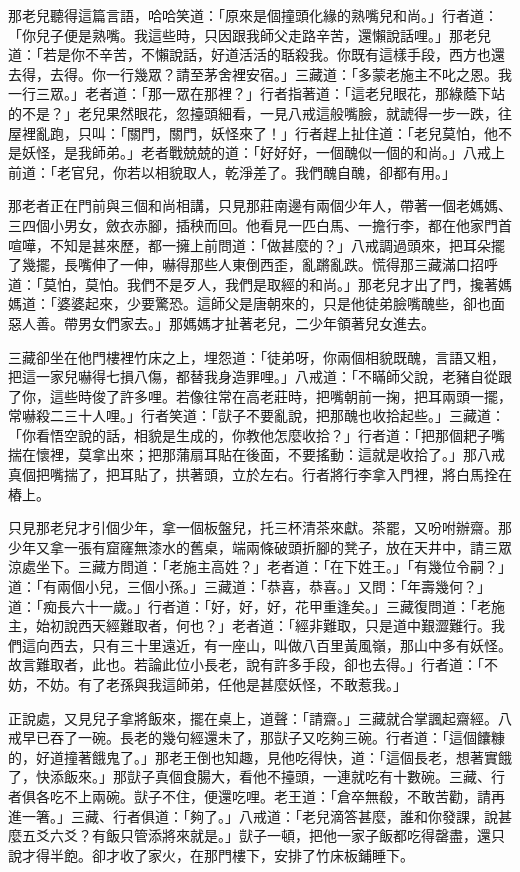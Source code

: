 那老兒聽得這篇言語，哈哈笑道：「原來是個撞頭化緣的熟嘴兒和尚。」行者道：「你兒子便是熟嘴。我這些時，只因跟我師父走路辛苦，還懶說話哩。」那老兒道：「若是你不辛苦，不懶說話，好道活活的聒殺我。你既有這樣手段，西方也還去得，去得。你一行幾眾？請至茅舍裡安宿。」三藏道：「多蒙老施主不叱之恩。我一行三眾。」老者道：「那一眾在那裡？」行者指著道：「這老兒眼花，那綠蔭下站的不是？」老兒果然眼花，忽擡頭細看，一見八戒這般嘴臉，就諕得一步一跌，往屋裡亂跑，只叫：「關門，關門，妖怪來了！」行者趕上扯住道：「老兒莫怕，他不是妖怪，是我師弟。」老者戰兢兢的道：「好好好，一個醜似一個的和尚。」八戒上前道：「老官兒，你若以相貌取人，乾淨差了。我們醜自醜，卻都有用。」

那老者正在門前與三個和尚相講，只見那莊南邊有兩個少年人，帶著一個老媽媽、三四個小男女，斂衣赤腳，插秧而回。他看見一匹白馬、一擔行李，都在他家門首喧嘩，不知是甚來歷，都一擁上前問道：「做甚麼的？」八戒調過頭來，把耳朵擺了幾擺，長嘴伸了一伸，嚇得那些人東倒西歪，亂蹡亂跌。慌得那三藏滿口招呼道：「莫怕，莫怕。我們不是歹人，我們是取經的和尚。」那老兒才出了門，攙著媽媽道：「婆婆起來，少要驚恐。這師父是唐朝來的，只是他徒弟臉嘴醜些，卻也面惡人善。帶男女們家去。」那媽媽才扯著老兒，二少年領著兒女進去。

三藏卻坐在他門樓裡竹床之上，埋怨道：「徒弟呀，你兩個相貌既醜，言語又粗，把這一家兒嚇得七損八傷，都替我身造罪哩。」八戒道：「不瞞師父說，老豬自從跟了你，這些時俊了許多哩。若像往常在高老莊時，把嘴朝前一掬，把耳兩頭一擺，常嚇殺二三十人哩。」行者笑道：「獃子不要亂說，把那醜也收拾起些。」三藏道：「你看悟空說的話，相貌是生成的，你教他怎麼收拾？」行者道：「把那個耙子嘴揣在懷裡，莫拿出來；把那蒲扇耳貼在後面，不要搖動：這就是收拾了。」那八戒真個把嘴揣了，把耳貼了，拱著頭，立於左右。行者將行李拿入門裡，將白馬拴在樁上。

只見那老兒才引個少年，拿一個板盤兒，托三杯清茶來獻。茶罷，又吩咐辦齋。那少年又拿一張有窟窿無漆水的舊桌，端兩條破頭折腳的凳子，放在天井中，請三眾涼處坐下。三藏方問道：「老施主高姓？」老者道：「在下姓王。」「有幾位令嗣？」道：「有兩個小兒，三個小孫。」三藏道：「恭喜，恭喜。」又問：「年壽幾何？」道：「痴長六十一歲。」行者道：「好，好，好，花甲重逢矣。」三藏復問道：「老施主，始初說西天經難取者，何也？」老者道：「經非難取，只是道中艱澀難行。我們這向西去，只有三十里遠近，有一座山，叫做八百里黃風嶺，那山中多有妖怪。故言難取者，此也。若論此位小長老，說有許多手段，卻也去得。」行者道：「不妨，不妨。有了老孫與我這師弟，任他是甚麼妖怪，不敢惹我。」

正說處，又見兒子拿將飯來，擺在桌上，道聲：「請齋。」三藏就合掌諷起齋經。八戒早已吞了一碗。長老的幾句經還未了，那獃子又吃夠三碗。行者道：「這個饢糠的，好道撞著餓鬼了。」那老王倒也知趣，見他吃得快，道：「這個長老，想著實餓了，快添飯來。」那獃子真個食腸大，看他不擡頭，一連就吃有十數碗。三藏、行者俱各吃不上兩碗。獃子不住，便還吃哩。老王道：「倉卒無殽，不敢苦勸，請再進一箸。」三藏、行者俱道：「夠了。」八戒道：「老兒滴答甚麼，誰和你發課，說甚麼五爻六爻？有飯只管添將來就是。」獃子一頓，把他一家子飯都吃得罄盡，還只說才得半飽。卻才收了家火，在那門樓下，安排了竹床板鋪睡下。

